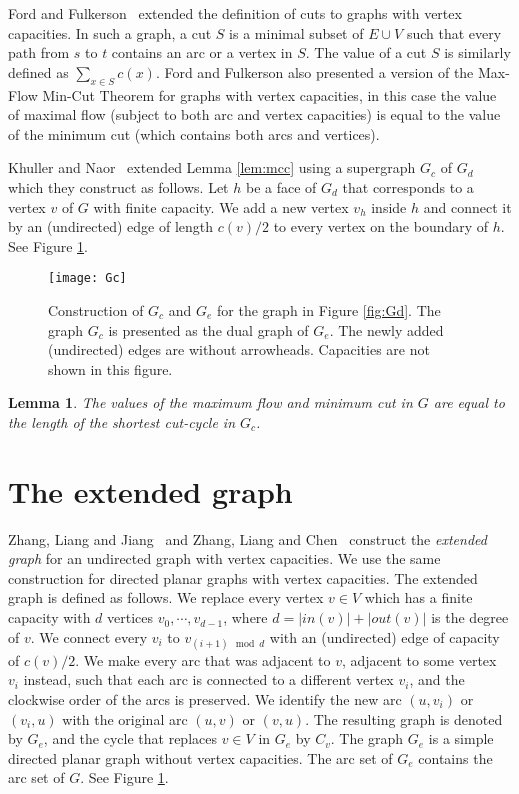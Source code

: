 \documentclass[a4paper,11pt]{article}
\newtheorem{lemma}[theorem]{Lemma}
\begin{document}
Ford and Fulkerson~\cite[Chapter I.11]{FF62} extended the definition of cuts to graphs
with vertex capacities. In such a graph, a cut $S$ is a minimal subset
of $E \cup V$ such that every path from $s$ to $t$ contains an arc or
a vertex in $S$. The value of a cut $S$ is similarly defined as
$\sum_{x \in S} c(x)$. Ford and Fulkerson also presented a version of the Max-Flow Min-Cut Theorem
for graphs with vertex capacities, in this case the value of maximal flow (subject to both arc and
vertex capacities) is equal to the value of the minimum cut (which contains both arcs and vertices).

Khuller and Naor~\cite{KN94} extended Lemma \ref{lem:mcc}
using a supergraph $G_c$ of $G_d$
which they construct as follows.
Let $h$ be a face of $G_d$ that corresponds to a vertex $v$ of $G$ with finite
capacity. We add
 a new vertex $v_h$ inside $h$
 and connect it by an (undirected) edge of length $c(v)/2$
 to every vertex on the boundary of $h$. See Figure \ref{fig:Gc}.

\begin{figure}
    \centering
    \texttt{[image: Gc]}
    \caption{Construction of $G_c$ and $G_e$ for the graph in Figure \ref{fig:Gd}.
    The graph $G_c$ is presented as the dual graph of $G_e$. The newly added (undirected) edges are without arrowheads. Capacities are not shown in this figure.}
    \label{fig:Gc}
\end{figure}

\begin{lemma} \cite{KN94} \label{lem:Gc}
    The values of the maximum flow and minimum cut in $G$ are
equal to the length of the shortest cut-cycle in $G_c$.
\end {lemma}

\section{The extended graph} \label{sec:ext}

 Zhang, Liang and Jiang~\cite{ZLJ06} and Zhang, Liang and Chen~\cite{ZLC08} construct the \emph{extended graph} for an undirected graph
with vertex capacities. We use the same construction for directed
planar graphs with vertex capacities.
The extended graph is defined as follows.
We replace every vertex
$v \in V$ which has a
 finite capacity with $d$ vertices $v_0, \cdots, v_{d-1}$, where $d = |in(v)| + |out(v)|$
is the degree of $v$. We connect every $v_i$ to $v_{(i + 1)\mod d}$ with an (undirected)
edge of capacity of $c(v)/2$.
We make every arc that was adjacent
to $v$, adjacent to some vertex $v_i$ instead, such that each arc is
connected to a different vertex $v_i$, and the clockwise order of the arcs
is preserved. We identify the new arc $(u, v_i)$ or $(v_i, u)$ with
the original arc $(u, v)$ or $(v, u)$. The resulting graph is denoted
by $G_e$, and the cycle that replaces $v \in V$ in $G_e$ by $C_v$.
 The graph $G_e$ is a simple directed planar graph
without vertex  capacities.
The arc set of $G_e$ contains the arc set of $G$.
See Figure \ref{fig:Gc}.
\end{document}
